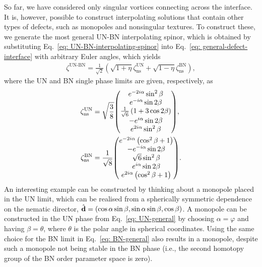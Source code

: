 So far, we have considered only singular vortices connecting across the
interface.
It is, however, possible to construct interpolating solutions that contain
other types of defects, such as monopoles and nonsingular textures.
To construct these, we generate the most general UN-BN interpolating spinor,
which is obtained by substituting Eq.~\eqref{eq: UN-BN-interpolating-spinor}
into Eq.~\eqref{eq: general-defect-interface} with arbitrary Euler
angles, which yields
\begin{align}\label{eq: UN-BN-general}
    \zeta^\text{UN-BN}=\frac{1}{\sqrt{2}}\left(
        \sqrt{1+\eta}\zeta^\text{UN}_\text{ns} + 
        \sqrt{1-\eta}\zeta^\text{BN}_\text{ns}
        \right),
\end{align}
where the UN and BN single phase limits are given, respectively, as
\begin{align}\label{eq: UN-general}
    \zeta^\text{UN}_\text{ns} &= \sqrt{\frac{3}{8}}
    \mqty(
        e^{-2i\alpha}\sin^2\beta \\
        e^{-i\alpha}\sin 2 \beta \\
        \frac{1}{\sqrt{6}}\left(1+3\cos 2\beta\right) \\
        -e^{i\alpha} \sin 2 \beta \\
        e^{2i\alpha}\sin^2\beta
    ), \\
    \zeta^\text{BN}_\text{ns} &= \frac{1}{\sqrt{8}} \label{eq: BN-general}
    \mqty(
        e^{-2i\alpha}\left(\cos^2\beta + 1\right) \\
        - e^{-i\alpha}\sin 2 \beta \\
        \sqrt{6}\sin^2\beta \\
        e^{i\alpha}\sin 2 \beta \\
        e^{2i\alpha}\left(\cos^2\beta + 1\right)          
    ).
\end{align}
An interesting example can be constructed by thinking about a monopole placed in
the UN limit, which can be realised from a spherically symmetric dependence
on the nematic director, \(\hat{\vb{d}} = (\cos\alpha \sin\beta, \sin\alpha
\sin\beta, \cos\beta)\).
A monopole can be constructed in the UN phase from Eq.~\eqref{eq: UN-general}
by choosing \(\alpha=\varphi \) and having \(\beta = \theta \), where
\(\theta \) is the polar angle in spherical coordinates.
Using the same choice for the BN limit in Eq.~\eqref{eq: BN-general} also
results in a monopole, despite such a monopole not being stable in the BN phase
(i.e., the second homotopy group of the BN order parameter space is zero).

